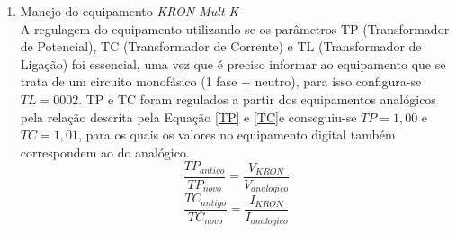 \documentclass[a4paper,12pt,oneside,openany,table,xcdraw]{article}
\begin{document}
\begin{enumerate}[1 - ]
\vspace{0.3cm}

\item Manejo do equipamento \emph{KRON Mult K}\\
A regulagem do equipamento utilizando-se os parâmetros TP (Transformador de Potencial), TC (Transformador de Corrente) e TL (Transformador de Ligação) foi essencial, uma vez que é preciso informar ao equipamento que se trata de um circuito monofásico (1 fase + neutro), para isso configura-se $TL=0002$. TP e TC foram regulados a partir dos equipamentos analógicos pela relação descrita pela Equação \ref{TP} e \ref{TC}e conseguiu-se $TP=1,00$ e $TC=1,01$, para os quais os valores no equipamento digital também correspondem ao do analógico.
\begin{equation}\label{TP}
\dfrac{{TP}_{antigo}}{{TP}_{novo}}=\dfrac{V_{KRON}}{V_{analogico}}
\end{equation}
\begin{equation}\label{TC}
\dfrac{{TC}_{antigo}}{{TC}_{novo}}=\dfrac{I_{KRON}}{I_{analogico}}
\end{equation}

\end{enumerate}
\end{document}
